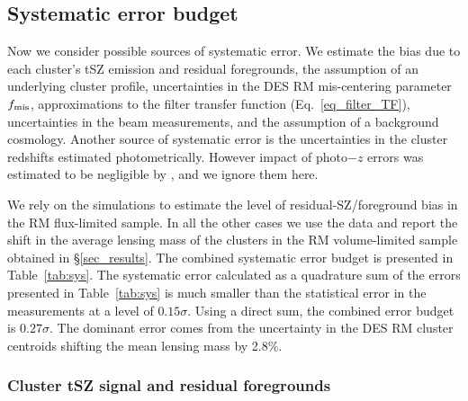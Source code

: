\subsection{Systematic error budget}\label{mqe_sec_systematics}

Now we consider possible sources of systematic error. %
 We estimate the bias due to each cluster's tSZ emission and residual foregrounds, the assumption of an underlying cluster profile, uncertainties in the DES RM mis-centering parameter $f_{\rm mis}$, approximations to the filter transfer function (Eq.~\ref{eq_filter_TF}), uncertainties in the beam measurements, and the assumption of a background cosmology.
Another source of systematic error is the uncertainties in the cluster redshifts estimated photometrically.
However impact of photo$-z$ errors was estimated to be negligible by \cite{raghunathan17a}, and we ignore them here.

We rely on the \cite{sehgal10} simulations to estimate the level of residual-SZ/foreground bias in the RM \whichyear{} flux-limited sample.
In all the other cases we use the data and report the shift in the average lensing mass of the clusters in the RM \whichyear{} volume-limited sample obtained in \S\ref{sec_results}. %
The combined systematic error budget is presented in Table~\ref{tab:sys}.
The systematic error calculated as a quadrature sum of the errors presented in Table~\ref{tab:sys} is much smaller than the statistical error in the measurements at a level of $0.15\sigma$. 
Using a direct sum, the combined error budget is $0.27\sigma$.
The dominant error comes from the uncertainty in the DES RM cluster centroids shifting the mean lensing mass by 2.8\%. 


\subsubsection{Cluster tSZ signal and residual foregrounds}\label{subsec_tszbias}

